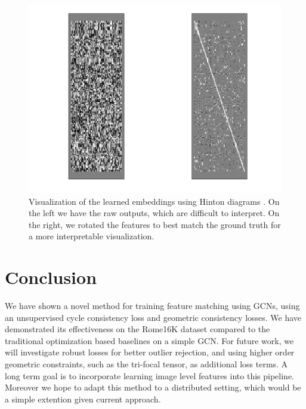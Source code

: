 \documentclass[10pt,twocolumn,letterpaper]{article}
\begin{document}
\begin{figure}[t]
\begin{center}
  \includegraphics[width=0.8\linewidth]{figures/EmbeddingsViz.png}
  \end{center}
     \caption{
         Visualization of the learned embeddings using Hinton diagrams \cite{bremner1994hinton}.
         On the left we have the raw outputs, which are difficult to interpret.
         On the right, we rotated the features to best match the ground truth for a more interpretable visualization.
     }
  \label{fig:onecol}
  \label{fig:embeddingsviz}
\end{figure}
\section{Conclusion}

We have shown a novel method for training feature matching using GCNs, using an unsupervised cycle consistency loss and geometric consistency losses.
We have demonstrated its effectiveness on the Rome16K dataset compared to the traditional optimization based baselines on a simple GCN.
For future work, we will investigate robust losses for better outlier rejection, and using higher order geometric constraints, such as the tri-focal tensor, as additional loss terms.
A long term goal is to incorporate learning image level features into this pipeline.
Moreover we hope to adapt this method to a distributed setting, which would be a simple extention given current approach.

{\small


}
\end{document}
